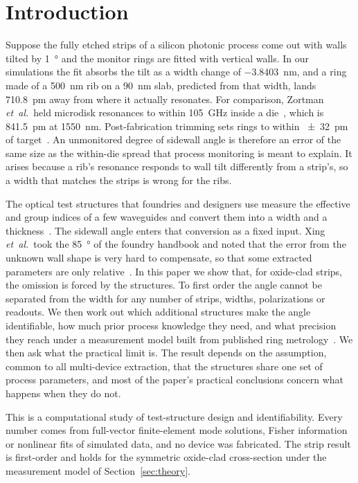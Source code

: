 \section{Introduction}
\label{sec:intro}

Suppose the fully etched strips of a silicon photonic process come out with walls tilted by \qty{1}{\degree} and the
monitor rings are fitted with vertical walls. In our simulations the fit absorbs the tilt as a width change of
\qty{-3.8403}{nm}, and a ring made of a \qty{500}{nm} rib on a \qty{90}{nm} slab, predicted from that width, lands
\qty{710.8}{pm} away from where it actually resonates. For comparison, Zortman \textit{et~al.}\ held microdisk resonances to within
\qty{105}{GHz} inside a die~\cite{zortman2010}, which is \qty{841.5}{pm} at \qty{1550}{nm}. Post-fabrication trimming
sets rings to within \qty{\pm 32}{pm} of target~\cite{jayatilleka2021}. An unmonitored degree of sidewall angle is therefore
an error of the same size as the within-die spread that process monitoring is meant to explain. It arises because a
rib's resonance responds to wall tilt differently from a strip's, so a width that matches the strips is wrong for
the ribs.

The optical test structures that foundries and designers use measure the effective and group indices of a few
waveguides and convert them into a width and a thickness~\cite{xing2018,zortman2010,lu2017}. The sidewall angle
enters that conversion as a fixed input. Xing \textit{et~al.}\ took the \qty{85}{\degree} of the foundry handbook and
noted that the error from the unknown wall shape is very hard to compensate, so that some extracted parameters are
only relative~\cite{xing2018}. In this paper we show that, for oxide-clad strips, the omission is forced by the
structures. To first order the angle cannot be separated from the width for any number of strips, widths,
polarizations or readouts. We then work out which additional structures make the angle identifiable, how much prior
process knowledge they need, and what precision they reach under a measurement model built from published ring
metrology~\cite{janz2023}. We then ask what the practical limit is. The result depends on the assumption, common to all multi-device
extraction, that the structures share one set of process parameters, and most of the paper's practical conclusions concern what
happens when they do not.

This is a computational study of test-structure design and identifiability. Every number comes from full-vector
finite-element mode solutions, Fisher information or nonlinear fits of simulated data, and no device was fabricated.
The strip result is first-order and holds for the symmetric oxide-clad cross-section under the measurement model of
Section~\ref{sec:theory}.

